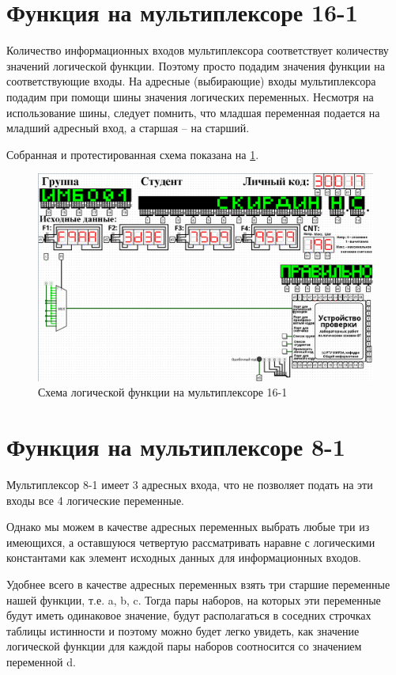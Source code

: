 \documentclass[14pt, a4paper]{extreport}
\begin{document}
\section{Функция на мультиплексоре 16-1}
Количество информационных входов мультиплексора соответствует количеству значений логической функции. Поэтому просто подадим значения функции на соответствующие входы. На адресные (выбирающие) входы мультиплексора подадим при помощи шины значения логических переменных. Несмотря на использование шины, следует помнить, что младшая переменная подается на младший адресный вход, а старшая – на старший.

Собранная и протестированная схема показана на \cref{fig:multiplexer-16-1}.

\begin{figure}[H]
	\caption{Схема логической функции на мультиплексоре 16-1}
	\label{fig:multiplexer-16-1}
	\includegraphics[width=\textwidth]{multiplexer-16-1}
\end{figure}

\section{Функция на мультиплексоре 8-1}
Мультиплексор 8-1 имеет 3 адресных входа, что не позволяет подать на эти входы все 4 логические переменные.

Однако мы можем в качестве адресных переменных выбрать любые три из имеющихся, а оставшуюся четвертую рассматривать наравне с логическими константами как элемент исходных данных для информационных входов.

Удобнее всего в качестве адресных переменных взять три старшие переменные нашей функции, т.е. a, b, c. Тогда пары наборов, на которых эти переменные будут иметь одинаковое значение, будут располагаться в соседних строчках таблицы истинности и поэтому можно будет легко увидеть, как значение логической функции для каждой пары наборов соотносится со значением переменной d.
\end{document}

